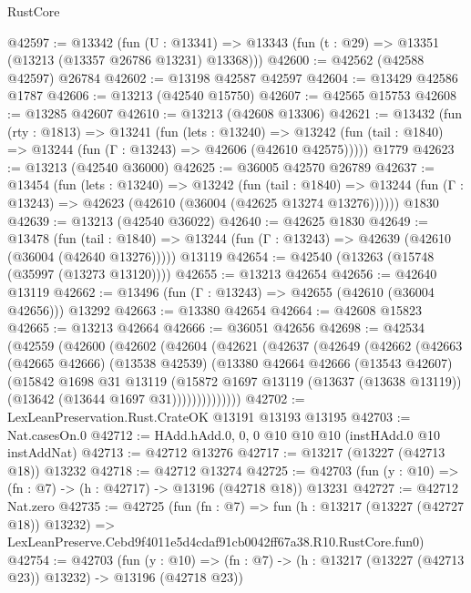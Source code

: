 \begin{lexlean}{RustCore}
\begin{coremodule}
@42597 := @13342
    (fun (U : @13341) => @13343 (fun (t : @29) => @13351 (@13213 (@13357 @26786 @13231) @13368)))
@42600 := @42562 (@42588 @42597) @26784
@42602 := @13198 @42587 @42597
@42604 := @13429 @42586 @1787
@42606 := @13213 (@42540 @15750)
@42607 := @42565 @15753
@42608 := @13285 @42607
@42610 := @13213 (@42608 @13306)
@42621 := @13432
    (fun (rty : @1813) =>
    @13241
      (fun (lets : @13240) =>
      @13242 (fun (tail : @1840) => @13244 (fun (Γ : @13243) => @42606 (@42610 @42575)))))
    @1779
@42623 := @13213 (@42540 @36000)
@42625 := @36005 @42570 @26789
@42637 := @13454
    (fun (lets : @13240) =>
    @13242
      (fun (tail : @1840) =>
      @13244 (fun (Γ : @13243) => @42623 (@42610 (@36004 (@42625 @13274 @13276))))))
    @1830
@42639 := @13213 (@42540 @36022)
@42640 := @42625 @1830
@42649 := @13478
    (fun (tail : @1840) => @13244 (fun (Γ : @13243) => @42639 (@42610 (@36004 (@42640 @13276)))))
    @13119
@42654 := @42540 (@13263 (@15748 (@35997 (@13273 @13120))))
@42655 := @13213 @42654
@42656 := @42640 @13119
@42662 := @13496 (fun (Γ : @13243) => @42655 (@42610 (@36004 @42656))) @13292
@42663 := @13380 @42654
@42664 := @42608 @15823
@42665 := @13213 @42664
@42666 := @36051 @42656
@42698 := @42534
    (@42559
      (@42600
        (@42602
          (@42604
            (@42621
              (@42637
                (@42649
                  (@42662
                    (@42663
                      (@42665 @42666)
                      (@13538 @42539)
                      (@13380
                        @42664
                        @42666
                        (@13543 @42607)
                        (@15842
                          @1698
                          @31
                          @13119
                          (@15872
                            @1697
                            @13119
                            (@13637 (@13638 @13119))
                            (@13642 (@13644 @1697 @31))))))))))))))
@42702 := LexLeanPreservation.Rust.CrateOK @13191 @13193 @13195
@42703 := Nat.casesOn.{0}
@42712 := HAdd.hAdd.{0, 0, 0} @10 @10 @10 (instHAdd.{0} @10 instAddNat)
@42713 := @42712 @13276
@42717 := @13217 (@13227 (@42713 @18)) @13232
@42718 := @42712 @13274
@42725 := @42703 (fun (y : @10) => (fn : @7) -> (h : @42717) -> @13196 (@42718 @18)) @13231
@42727 := @42712 Nat.zero
@42735 := @42725
    (fun (fn : @7) =>
    fun (h : @13217 (@13227 (@42727 @18)) @13232) =>
    LexLeanPreserve.Cebd9f4011e5d4cdaf91cb0042ff67a38.R10.RustCore.fun0)
@42754 := @42703
    (fun (y : @10) => (fn : @7) -> (h : @13217 (@13227 (@42713 @23)) @13232) -> @13196 (@42718 @23))

\end{coremodule}
\end{lexlean}
